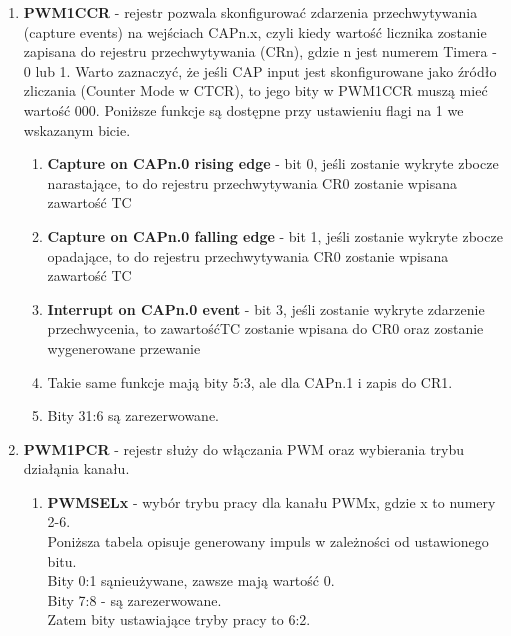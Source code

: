 \begin{enumerate}
\begin{enumerate}
\begin{enumerate}
            \item \textbf{PWM1CCR} - rejestr pozwala skonfigurować zdarzenia przechwytywania (capture events) na wejściach CAPn.x, czyli kiedy wartość licznika zostanie zapisana do rejestru przechwytywania (CRn), gdzie n jest numerem Timera - 0 lub 1. Warto zaznaczyć, że jeśli CAP input jest skonfigurowane jako źródło zliczania (Counter Mode w CTCR), to jego bity w PWM1CCR muszą mieć wartość 000.
                Poniższe funkcje są dostępne przy ustawieniu flagi na 1 we wskazanym bicie.
                \begin{enumerate}
                    \item \textbf{Capture on CAPn.0 rising edge} - bit 0, jeśli zostanie wykryte zbocze narastające, to do rejestru przechwytywania CR0 zostanie wpisana zawartość TC
                    \item \textbf{Capture on CAPn.0 falling edge} - bit 1, jeśli zostanie wykryte zbocze opadające, to do rejestru przechwytywania CR0 zostanie wpisana zawartość TC
                    \item \textbf{Interrupt on CAPn.0 event} - bit 3, jeśli zostanie wykryte zdarzenie przechwycenia, to zawartośćTC zostanie wpisana do CR0 oraz zostanie wygenerowane przewanie
                    \item Takie same funkcje mają bity 5:3, ale dla CAPn.1 i zapis do CR1.
                    \item Bity 31:6 są zarezerwowane.
                \end{enumerate}
            \item \textbf{PWM1PCR} - rejestr służy do włączania PWM oraz wybierania trybu działąnia kanału.
                \begin{enumerate}
                    \item \textbf{PWMSELx} - wybór trybu pracy dla kanału PWMx, gdzie x to numery 2-6.\\
                        Poniższa tabela opisuje generowany impuls w zależności od ustawionego bitu. \\
                        Bity 0:1 sąnieużywane, zawsze mają wartość 0.\\
                        Bity 7:8 - są zarezerwowane.\\
                        Zatem bity ustawiające tryby pracy to 6:2.
                        \begin{table}[H]
                            \centering
                            \begin{tabular}{|c|c|p{10cm}|}

\end{tabular}
\end{table}
\end{enumerate}
\end{enumerate}
\end{enumerate}
\end{enumerate}
